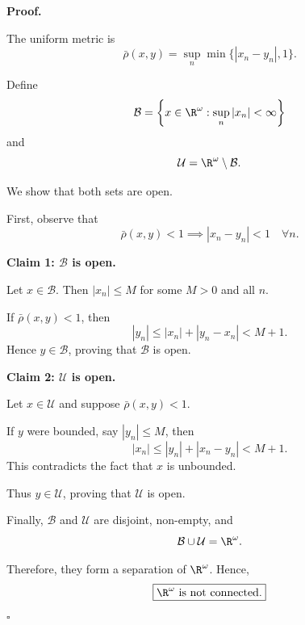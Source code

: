 
\textbf{Proof.}

The uniform metric is
\[ \bar{\rho}(x,y)=\sup_n\min\{|x_n-y_n|,1\}. \]

Define
\[ \mathcal{B}=\left\{x\in\R^{\omega}:\sup_n|x_n|<\infty\right\} \]
and
\[ \mathcal{U}=\R^{\omega}\setminus\mathcal{B}. \]

We show that both sets are open.

First, observe that
\[ \bar{\rho}(x,y)<1\implies |x_n-y_n|<1\quad\forall n. \]

\textbf{Claim 1: $\mathcal{B}$ is open.}

Let $x\in\mathcal{B}$. Then $|x_n|\leq M$ for some $M>0$ and all $n$.

If $\bar{\rho}(x,y)<1$, then
\[ |y_n|\leq |x_n|+|y_n-x_n|<M+1. \]
Hence $y\in\mathcal{B}$, proving that $\mathcal{B}$ is open.

\textbf{Claim 2: $\mathcal{U}$ is open.}

Let $x\in\mathcal{U}$ and suppose $\bar{\rho}(x,y)<1$.

If $y$ were bounded, say $|y_n|\leq M$, then
\[ |x_n|\leq |y_n|+|x_n-y_n|<M+1. \]
This contradicts the fact that $x$ is unbounded.

Thus $y\in\mathcal{U}$, proving that $\mathcal{U}$ is open.

Finally, $\mathcal{B}$ and $\mathcal{U}$ are disjoint, non-empty, and
\[ \mathcal{B}\cup\mathcal{U}=\R^{\omega}. \]

Therefore, they form a separation of $\R^{\omega}$. Hence,
\[ \boxed{\R^{\omega}\text{ is not connected.}} \]
\hfill $\square$
